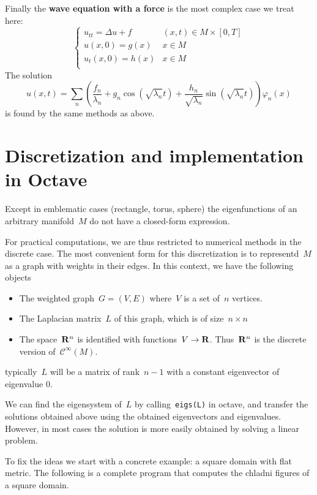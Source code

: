 Finally the {\bf wave equation with a force} is the most complex case we treat here:
$$
\begin{cases}
	u_{tt} = \Delta u +f& (x,t)\in M\times[0,T] \\
	u(x,0) = g(x) & x\in M \\
	u_t(x,0) = h(x) & x\in M \\
\end{cases}
$$
The solution
$$
	u(x,t)=\sum_n\left(
	\frac{f_n}{\lambda_n}
	+
	g_n\cos\left(\sqrt{\lambda_n} t\right)
	+
	\frac{h_n}{\sqrt{\lambda_n}}\sin\left(\sqrt{\lambda_n} t\right)
	\right)\varphi_n(x)
$$
is found by the same methods as above.


\section{Discretization and implementation in Octave}

Except in emblematic cases (rectangle, torus, sphere) the eigenfunctions of
an arbitrary manifold~$M$ do not have a closed-form expression.

For practical computations, we are thus restricted to numerical methods in the
discrete case.  The most convenient form for this discretization is to
representd~$M$ as a graph with weights in their edges.  In this context, we
have the following objects
\begin{itemize}
	\item The weighted graph~$G=(V,E)$ where~$V$ is a set of~$n$ vertices.
	\item The Laplacian matrix~$L$ of this graph, which is of
		size~$n\times n$
	\item The space~$\mathbf{R}^n$ is identified with functions~$V\to\mathbf{R}$.
		Thus~$\mathbf{R}^n$ is the discrete version of~$\mathcal{C}^\infty(M)$.
\end{itemize}
typically~$L$ will be a matrix of rank~$n-1$ with a constant eigenvector of
eigenvalue 0.

We can find the eigensystem of~$L$ by calling~\verb+eigs(L)+ in octave, and
transfer the solutions obtained above using the obtained eigenvectors and
eigenvalues.  However, in most cases the solution is more easily obtained by
solving a linear problem.

To fix the ideas we start with a concrete example: a square domain with flat
metric.  The following is a complete program that computes the chladni
figures of a square domain.

